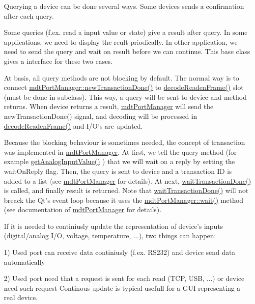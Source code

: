 Querying a device can be done several ways. Some devices sends a confirmation after each query.

Some queries (f.ex. read a input value or state) give a result after query. In some applications, we need to display the reult priodically. In other application, we need to send the query and wait on result before we can continue. This base class gives a interface for these two cases.

At basis, all query methods are not blocking by default. The normal way is to connect \hyperlink{classmdt_port_manager_a416a24db1048e9f66aef27ea810954d2}{mdtPortManager::newTransactionDone()} to \hyperlink{classmdt_device_ad211ba3be781c3db0397d5bf91f796d1}{decodeReadenFrame()} slot (must be done in subclass). This way, a query will be sent to device and method returns. When device returns a result, \hyperlink{classmdt_port_manager}{mdtPortManager} will send the newTransactionDone() signal, and decoding will be processed in \hyperlink{classmdt_device_ad211ba3be781c3db0397d5bf91f796d1}{decodeReadenFrame()} and I/O's are updated.

Because the blocking behaviour is sometimes needed, the concept of transaction was implemented in \hyperlink{classmdt_port_manager}{mdtPortManager}. At first, we tell the query method (for example \hyperlink{classmdt_device_ab828764660ba53ffce1995901ddf5a0a}{getAnalogInputValue()} ) that we will wait on a reply by setting the waitOnReply flag. Then, the query is sent to device and a transaction ID is added to a list (see \hyperlink{classmdt_port_manager}{mdtPortManager} for details). At next, \hyperlink{classmdt_device_ab937015c1a319b7234442a4cc29a02a8}{waitTransactionDone()} is called, and finally result is returned. Note that \hyperlink{classmdt_device_ab937015c1a319b7234442a4cc29a02a8}{waitTransactionDone()} will not breack the Qt's event loop because it uses the \hyperlink{classmdt_port_manager_aaa85e0200aba0e0f4392dfe01abae2cf}{mdtPortManager::wait()} method (see documentation of \hyperlink{classmdt_port_manager}{mdtPortManager} for details).

If it is needed to continiusly update the representation of device's inputs (digital/analog I/O, voltage, temperature, ...), two things can happen:
\begin{DoxyItemize}
\item 1) Used port can receive data continiusly (f.ex. RS232) and device send data automatically
\item 2) Used port need that a request is sent for each read (TCP, USB, ...) or device need such request Continous update is typical usefull for a GUI representing a real device.
\end{DoxyItemize}

